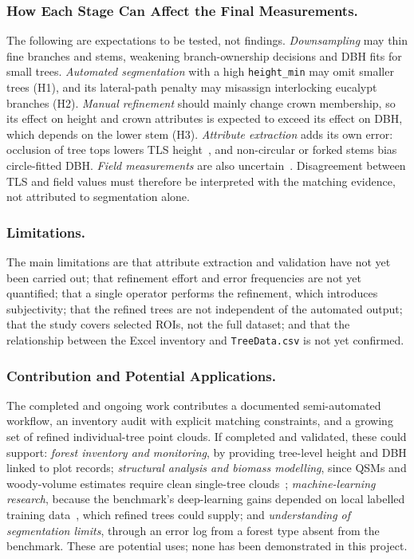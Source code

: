 \documentclass[runningheads]{llncs}
\begin{document}
\subsubsection{How Each Stage Can Affect the Final Measurements.}
The following are expectations to be tested, not findings. \emph{Downsampling} may thin fine branches and stems, weakening branch-ownership decisions and DBH fits for small trees. \emph{Automated segmentation} with a high \texttt{height\_min} may omit smaller trees (H1), and its lateral-path penalty may misassign interlocking eucalypt branches (H2). \emph{Manual refinement} should mainly change crown membership, so its effect on height and crown attributes is expected to exceed its effect on DBH, which depends on the lower stem (H3). \emph{Attribute extraction} adds its own error: occlusion of tree tops lowers TLS height~\cite{calders2020,cushman2026}, and non-circular or forked stems bias circle-fitted DBH. \emph{Field measurements} are also uncertain~\cite{cushman2026}. Disagreement between TLS and field values must therefore be interpreted with the matching evidence, not attributed to segmentation alone.

\subsubsection{Limitations.}
The main limitations are that attribute extraction and validation have not yet been carried out; that refinement effort and error frequencies are not yet quantified; that a single operator performs the refinement, which introduces subjectivity; that the refined trees are not independent of the automated output; that the study covers selected ROIs, not the full dataset; and that the relationship between the Excel inventory and \texttt{TreeData.csv} is not yet confirmed.

\subsubsection{Contribution and Potential Applications.}
The completed and ongoing work contributes a documented semi-automated workflow, an inventory audit with explicit matching constraints, and a growing set of refined individual-tree point clouds. If completed and validated, these could support: \emph{forest inventory and monitoring}, by providing tree-level height and DBH linked to plot records; \emph{structural analysis and biomass modelling}, since QSMs and woody-volume estimates require clean single-tree clouds~\cite{calders2020}; \emph{machine-learning research}, because the benchmark's deep-learning gains depended on local labelled training data~\cite{cherlet2026}, which refined trees could supply; and \emph{understanding of segmentation limits}, through an error log from a forest type absent from the benchmark. These are potential uses; none has been demonstrated in this project.
\end{document}
